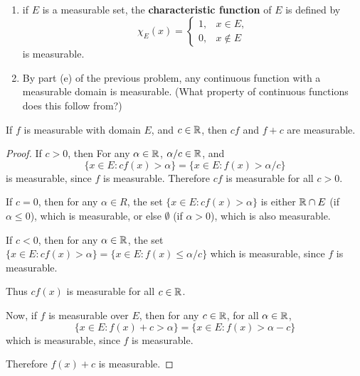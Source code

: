 \begin{ex}%
~
\begin{enumerate}
	\item if $E$ is a measurable set, the \textbf{characteristic function} 
	of $E$ is defined by 
	\begin{equation*}
		\chi_E (x) = 
	\left\{ \begin{matrix} 
		1, & x \in E, \\
		0, & x \notin E
	\end{matrix} \right.
	\end{equation*}
	is measurable. 
	\item By part (e) of the previous problem, any continuous function with a 
	measurable domain is measurable. (What property of continuous functions 
	does this follow from?) 
\end{enumerate}
\end{ex}

\pagebreak
\begin{pblm}%
	If $f$ is measurable with domain $E$, and $c \in \mathbb{R}$, then $cf$ and 
	$f + c$ are measurable. 
\begin{proof}
	If $c > 0$, then For any $\alpha \in \mathbb{R}$, $\alpha /c \in \mathbb{R}$, and 
	\begin{equation*}
		\{x \in E: cf(x) > \alpha\} = \{x \in E: f(x) > \alpha/c\}
	\end{equation*}
	is measurable, since $f$ is measurable. Therefore $cf$ is measurable for all 
	$c > 0$. 

	If $c = 0$, then for any $\alpha \in R$, 
	the set $\{x \in E: cf(x) > \alpha\}$ is either $\mathbb{R}\cap E$ 
	(if $\alpha \le 0$), which is measurable, or else $\emptyset$ (if $\alpha > 0$), 
	which is also measurable. 

	If $c < 0$, then for any $\alpha \in \mathbb{R}$, the set $\{x \in E: cf(x) > \alpha\} = 
	\{x \in E: f(x) \le \alpha / c\}$ which is measurable, since $f$ is measurable. 

	Thus $cf(x)$ is measurable for all $c \in \mathbb{R}$.

	Now, if $f$ is measurable over $E$, then for any $c \in \mathbb{R}$, for all $\alpha \in \mathbb{R}$, 
	\begin{equation*}
		\{x \in E: f(x) + c > \alpha\} = \{x \in E: f(x) > \alpha - c\}
	\end{equation*}
	which is measurable, since $f$ is measurable. 

	Therefore $f(x) + c$ is measurable. 
\end{proof}
\end{pblm}

